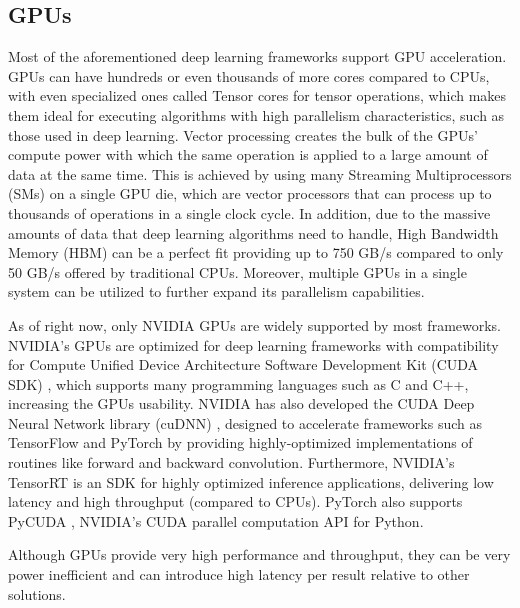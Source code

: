 \subsection{GPUs}
Most of the aforementioned deep learning frameworks support GPU acceleration. GPUs can have hundreds or even thousands of more cores compared to CPUs, with even specialized ones called Tensor cores for tensor operations, which makes them ideal for executing algorithms with high parallelism characteristics, such as those used in deep learning. Vector processing creates the bulk of the GPUs' compute power with which the same operation is applied to a large amount of data at the same time. This is achieved by using many Streaming Multiprocessors (SMs) on a single GPU die, which are vector processors that can process up to thousands of operations in a single clock cycle. In addition, due to the massive amounts of data that deep learning algorithms need to handle, High Bandwidth Memory (HBM) can be a perfect fit providing up to 750 GB/s compared to only 50 GB/s offered by traditional CPUs. Moreover, multiple GPUs in a single system can be utilized to further expand its parallelism capabilities.

As of right now, only NVIDIA GPUs are widely supported by most frameworks. NVIDIA's GPUs are optimized for deep learning frameworks with compatibility for Compute Unified Device Architecture Software Development Kit (CUDA SDK) \cite{NVIDIA-CUDA}, which supports many programming languages such as C and C++, increasing the GPUs usability. NVIDIA has also developed the CUDA Deep Neural Network library (cuDNN) \cite{cuDNN-Efficient-Primitives-for-Deep-Learning} \cite{NVIDIA-cuDNN}, designed to accelerate frameworks such as TensorFlow and PyTorch by providing highly-optimized implementations of routines like forward and backward convolution. Furthermore, NVIDIA's TensorRT \cite{NVIDIA-TensorRT} is an SDK for high\-ly optimized inference applications, delivering low latency and high throughput (compared to CPUs). PyTorch also supports PyCUDA \cite{NVIDIA-PyCUDA}, NVIDIA's CUDA parallel computation API for Python.

Although GPUs provide very high performance and throughput, they can be very power inefficient and can introduce high latency per result relative to other solutions.

